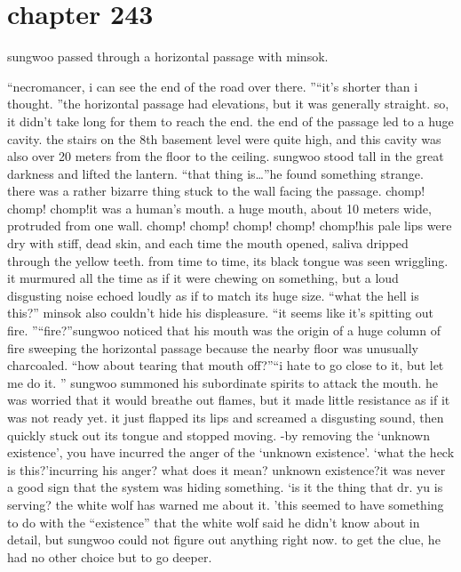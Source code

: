 \section{chapter 243}

                            sungwoo passed through a horizontal passage with minsok.





“necromancer, i can see the end of the road over there.
”“it’s shorter than i thought.
”the horizontal passage had elevations, but it was generally straight.
 so, it didn’t take long for them to reach the end.
the end of the passage led to a huge cavity.
 the stairs on the 8th basement level were quite high, and this cavity was also over 20 meters from the floor to the ceiling.
sungwoo stood tall in the great darkness and lifted the lantern.
“that thing is…”he found something strange.
 there was a rather bizarre thing stuck to the wall facing the passage.
chomp! chomp! chomp!it was a human’s mouth.
 a huge mouth, about 10 meters wide, protruded from one wall.
chomp! chomp! chomp! chomp! chomp!his pale lips were dry with stiff, dead skin, and each time the mouth opened, saliva dripped through the yellow teeth.
 from time to time, its black tongue was seen wriggling.
it murmured all the time as if it were chewing on something, but a loud disgusting noise echoed loudly as if to match its huge size.
“what the hell is this?” minsok also couldn’t hide his displeasure.
“it seems like it’s spitting out fire.
”“fire?”sungwoo noticed that his mouth was the origin of a huge column of fire sweeping the horizontal passage because the nearby floor was unusually charcoaled.
“how about tearing that mouth off?”“i hate to go close to it, but let me do it.
”
sungwoo summoned his subordinate spirits to attack the mouth.
 he was worried that it would breathe out flames, but it made little resistance as if it was not ready yet.
it just flapped its lips and screamed a disgusting sound, then quickly stuck out its tongue and stopped moving.
-by removing the ‘unknown existence’, you have incurred the anger of the ‘unknown existence’.
‘what the heck is this?’incurring his anger? what does it mean? unknown existence?it was never a good sign that the system was hiding something.
‘is it the thing that dr.
 yu is serving? the white wolf has warned me about it.
’this seemed to have something to do with the “existence” that the white wolf said he didn’t know about in detail, but sungwoo could not figure out anything right now.
 to get the clue, he had no other choice but to go deeper.
